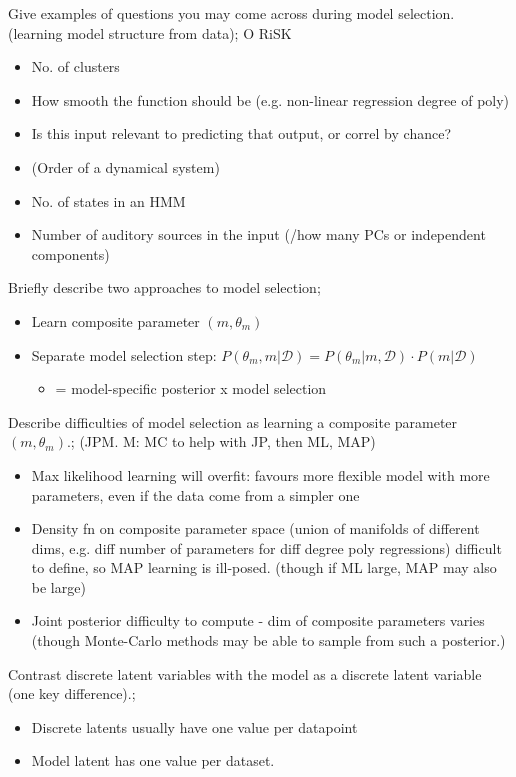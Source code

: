\documentclass{article}
\begin{document}
Give examples of questions you may come across during model selection. (learning model structure from data); O RiSK \begin{itemize} \item No. of clusters \item How smooth the function should be (e.g. non-linear regression degree of poly) \item Is this input relevant to predicting that output, or correl by chance?  \item (Order of a dynamical system) \item No. of states in an HMM \item Number of auditory sources in the input (/how many PCs or independent components) \end{itemize}

Briefly describe two approaches to model selection; \begin{itemize} \item Learn composite parameter $(m, \theta_m)$ \item Separate model selection step: $P(\theta_m, m|\mathcal{D})=P(\theta_m|m, \mathcal{D})\cdot P(m|\mathcal{D})$ \begin{itemize} \item = model-specific posterior x model selection \end{itemize} \end{itemize}

Describe difficulties of model selection as learning a composite parameter $(m, \theta_m)$.; (JPM. M: MC to help with JP, then ML, MAP) \begin{itemize} \item Max likelihood learning will overfit: favours more flexible model with more parameters, even if the data come from a simpler one \item Density fn on composite parameter space (union of manifolds of different dims, e.g. diff number of parameters for diff degree poly regressions) difficult to define, so MAP learning is ill-posed. (though if ML large, MAP may also be large) \item Joint posterior difficulty to compute - dim of composite parameters varies (though Monte-Carlo methods may be able to sample from such a posterior.) \end{itemize}

Contrast discrete latent variables with the model as a discrete latent variable (one key difference).; \begin{itemize} \item Discrete latents usually have one value per datapoint \item Model latent has one value per dataset.  \end{itemize}
\end{document}
